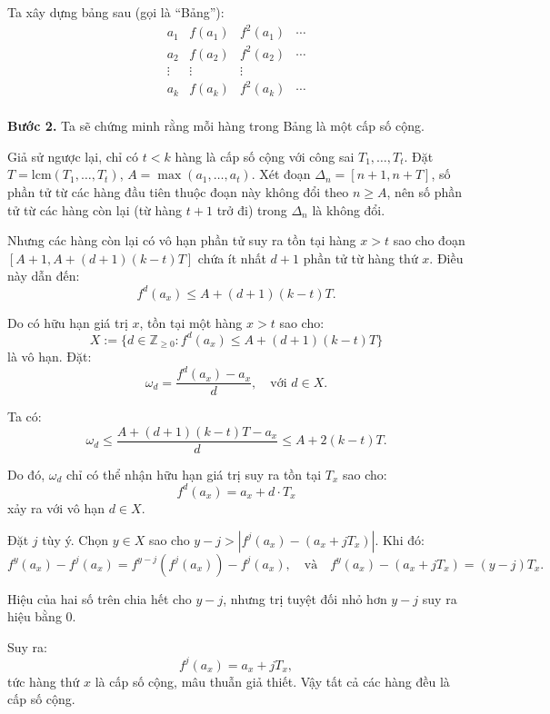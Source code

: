 \begin{problem}
\begin{soln}
    Ta xây dựng bảng sau (gọi là “Bảng”):
    \[
        \begin{array}{cccc}
            a_1 & f(a_1) & f^2(a_1) & \cdots \\
            a_2 & f(a_2) & f^2(a_2) & \cdots \\
            \vdots & \vdots & \vdots & \\
            a_k & f(a_k) & f^2(a_k) & \cdots \\
        \end{array}
    \]

    \textbf{Bước 2.} Ta sẽ chứng minh rằng mỗi hàng trong Bảng là một cấp số cộng.

    Giả sử ngược lại, chỉ có \( t < k \) hàng là cấp số cộng với công sai \( T_1, \ldots, T_t \).
    Đặt \( T = \text{lcm}(T_1, \ldots, T_t) \), \( A = \max(a_1, \ldots, a_t) \).
    Xét đoạn \( \Delta_n = [n+1, n+T] \), số phần tử từ các hàng đầu tiên thuộc đoạn này không đổi theo \( n \ge A \),
    nên số phần tử từ các hàng còn lại (từ hàng \( t+1 \) trở đi) trong \( \Delta_n \) là không đổi.

    Nhưng các hàng còn lại có vô hạn phần tử suy ra tồn tại hàng \( x > t \)
    sao cho đoạn \( [A+1, A + (d+1)(k - t)T] \) chứa ít nhất \( d+1 \) phần tử từ hàng thứ \( x \). Điều này dẫn đến:
    \[
        f^d(a_x) \le A + (d+1)(k - t)T.
    \]

    Do có hữu hạn giá trị \( x \), tồn tại một hàng \( x > t \) sao cho:
    \[
        X := \{ d \in \mathbb{Z}_{\ge 0} : f^d(a_x) \le A + (d+1)(k - t)T \}
    \]
    là vô hạn. Đặt:
    \[
        \omega_d = \frac{f^d(a_x) - a_x}{d}, \quad \text{với } d \in X.
    \]

    Ta có:
    \[
        \omega_d \le \frac{A + (d+1)(k - t)T - a_x}{d} \le A + 2(k - t)T.
    \]
    
    Do đó, \( \omega_d \) chỉ có thể nhận hữu hạn giá trị suy ra tồn tại \( T_x \) sao cho:
    \[
        f^d(a_x) = a_x + d \cdot T_x
    \]
    xảy ra với vô hạn \( d \in X \).

    Đặt \( j \) tùy ý. Chọn \( y \in X \) sao cho \( y - j > |f^j(a_x) - (a_x + jT_x)| \). Khi đó:
    \[
        f^y(a_x) - f^j(a_x) = f^{y-j}(f^j(a_x)) - f^j(a_x),\quad \text{và} \quad f^y(a_x) - (a_x + jT_x) = (y - j)T_x.
    \]
    
    Hiệu của hai số trên chia hết cho \( y - j \), nhưng trị tuyệt đối nhỏ hơn \( y - j \) suy ra hiệu bằng 0.

    Suy ra:
    \[
        f^j(a_x) = a_x + jT_x,
    \]
    tức hàng thứ \( x \) là cấp số cộng, mâu thuẫn giả thiết. Vậy tất cả các hàng đều là cấp số cộng.


\end{soln}
\end{problem}
